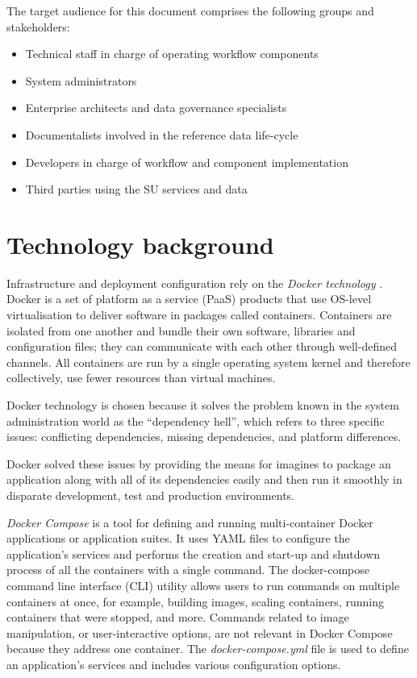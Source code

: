 	The target audience for this document comprises the following groups and stakeholders:	
	\begin{itemize}
		\item Technical staff in charge of operating workflow components
		\item System administrators
		\item Enterprise architects and data governance specialists
		\item Documentalists involved in the reference data life-cycle
		\item Developers in charge of workflow and component implementation
		\item Third parties using the SU services and data 
	\end{itemize}	
		
\section{Technology background}
\label{sec:background}

	Infrastructure and deployment configuration rely on the \textit{Docker technology} \citep{docker-merkel2014docker, docker}. Docker is a set of platform as a service (PaaS) products that use OS-level virtualisation to deliver software in packages called containers. Containers are isolated from one another and bundle their own software, libraries and configuration files; they can communicate with each other through well-defined channels. All containers are run by a single operating system kernel and therefore collectively, use fewer resources than virtual machines.

	Docker technology is chosen because it solves the problem known in the system administration world as the ``dependency hell'', which refers to three specific issues: conflicting dependencies, missing dependencies, and platform differences.

	Docker solved these issues by providing the means for imagines to package an application along with all of its dependencies easily and then run it smoothly in disparate development, test and production
environments.
		
	\textit{Docker Compose} is a tool for defining and running multi-container Docker applications or application suites. It uses YAML files to configure the application's services and performs the creation and start-up and shutdown process of all the containers with a single command. The docker-compose command line interface (CLI) utility allows users to run commands on multiple containers at once, for example, building images, scaling containers, running containers that were stopped, and more. Commands related to image manipulation, or user-interactive options, are not relevant in Docker Compose because they address one container. The \textit{docker-compose.yml} file is used to define an application's services and includes various configuration options.


